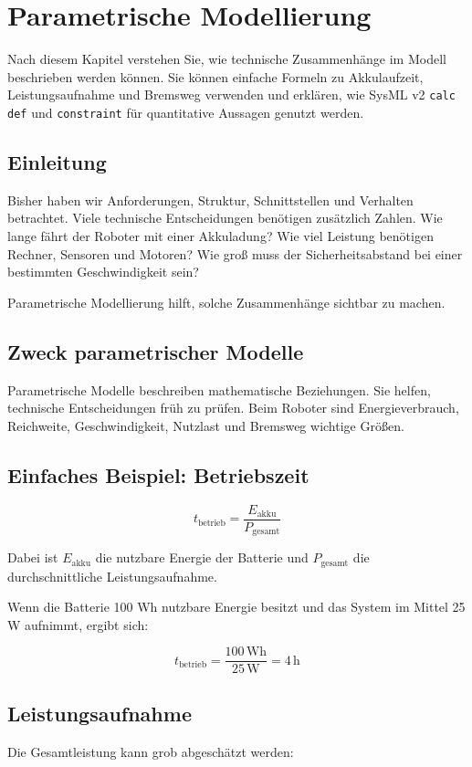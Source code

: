 \chapter{Parametrische Modellierung}

\begin{lernziele}
Nach diesem Kapitel verstehen Sie, wie technische Zusammenhänge im Modell beschrieben werden können. Sie können einfache Formeln zu Akkulaufzeit, Leistungsaufnahme und Bremsweg verwenden und erklären, wie SysML v2 \texttt{calc def} und \texttt{constraint} für quantitative Aussagen genutzt werden.
\end{lernziele}

\section{Einleitung}
Bisher haben wir Anforderungen, Struktur, Schnittstellen und Verhalten betrachtet. Viele technische Entscheidungen benötigen zusätzlich Zahlen. Wie lange fährt der Roboter mit einer Akkuladung? Wie viel Leistung benötigen Rechner, Sensoren und Motoren? Wie groß muss der Sicherheitsabstand bei einer bestimmten Geschwindigkeit sein?

Parametrische Modellierung hilft, solche Zusammenhänge sichtbar zu machen.

\section{Zweck parametrischer Modelle}
Parametrische Modelle beschreiben mathematische Beziehungen. Sie helfen, technische Entscheidungen früh zu prüfen. Beim Roboter sind Energieverbrauch, Reichweite, Geschwindigkeit, Nutzlast und Bremsweg wichtige Größen.

\section{Einfaches Beispiel: Betriebszeit}
\[
t_{\text{betrieb}} = \frac{E_{\text{akku}}}{P_{\text{gesamt}}}
\]

Dabei ist \(E_{\text{akku}}\) die nutzbare Energie der Batterie und \(P_{\text{gesamt}}\) die durchschnittliche Leistungsaufnahme.

Wenn die Batterie 100 Wh nutzbare Energie besitzt und das System im Mittel 25 W aufnimmt, ergibt sich:

\[
t_{\text{betrieb}} = \frac{100\,\text{Wh}}{25\,\text{W}} = 4\,\text{h}
\]

\section{Leistungsaufnahme}
Die Gesamtleistung kann grob abgeschätzt werden:

